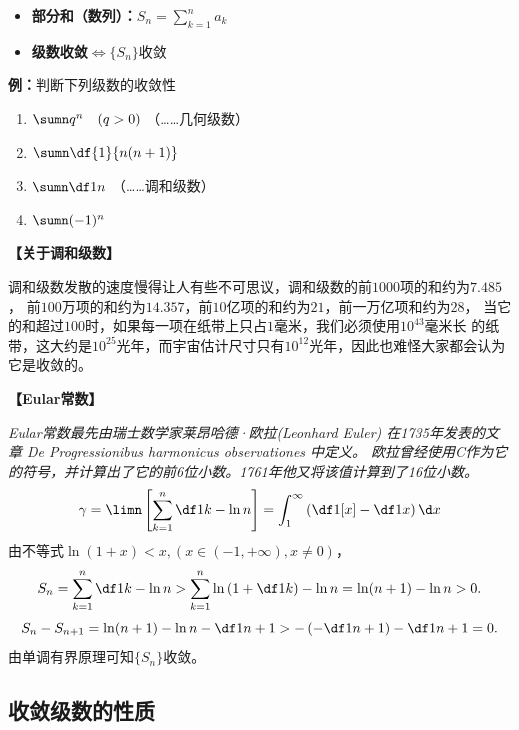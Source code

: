 \begin{itemize}
  \item {\bf 部分和（数列）：}$S_n=\sum\limits_{k=1}^na_k$
  \item {\bf 级数收敛}$\Leftrightarrow\{S_n\}$收敛
\end{itemize}

{\bf 例：}判断下列级数的收敛性
\begin{enumerate}[(1)]
  \setlength{\itemindent}{1cm}
  \item $\sumn q^n\quad (q>0)$ （\ldots\ldots 几何级数） 
  \item $\sumn\df{1}{n(n+1)}$ 
  \item $\sumn\df 1n$ （\ldots\ldots 调和级数） 
  \item $\sumn (-1)^n$
\end{enumerate}

\begin{shaded}
{\bf 【关于调和级数】}

调和级数发散的速度慢得让人有些不可思议，调和级数的前$1000$项的和约为$7.485$，
前$100$万项的和约为$14.357$，前$10$亿项的和约为$21$，前一万亿项和约为$28$，
当它的和超过$100$时，如果每一项在纸带上只占$1$毫米，我们必须使用$10^43$毫米长
的纸带，这大约是$10^25$光年，而宇宙估计尺寸只有$10^12$光年，因此也难怪大家都会认为它是收敛的。

{\bf 【Eular常数】}

{\it Eular常数最先由瑞士数学家莱昂哈德·欧拉(Leonhard Euler)
在1735年发表的文章 De Progressionibus harmonicus observationes 中定义。
欧拉曾经使用C作为它的符号，并计算出了它的前6位小数。1761年他又将该值计算到了16位小数。}
$$\gamma=\limn\left[\sum\limits_{k=1}^n\df1k-\ln n\right]
=\int_1^{\infty}\left(\df1{[x]}-\df1x\right)\d x$$
由不等式$\ln(1+x)<x,(x\in(-1,+\infty),x\ne 0)$，
$$S_n=\sum\limits_{k=1}^n\df1k-\ln n>\sum\limits_{k=1}^n
\ln\left(1+\df1k\right)-\ln n=\ln(n+1)-\ln n>0.$$
$$S_n-S_{n+1}=\ln(n+1)-\ln n-\df1{n+1}>-\left(-\df1{n+1}\right)
-\df1{n+1}=0.$$
由单调有界原理可知$\{S_n\}$收敛。
\end{shaded}

\subsection{收敛级数的性质}

